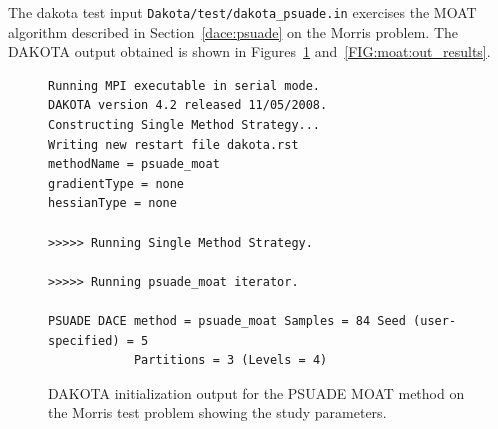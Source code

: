 The dakota test input {\tt Dakota/test/dakota\_psuade.in} exercises
the MOAT algorithm described in Section~\ref{dace:psuade} on the
Morris problem.  The DAKOTA output obtained is shown in
Figures~\ref{FIG:moat:out_preamble} and~\ref{FIG:moat:out_results}.
\begin{figure}[ht!]
\centering
\begin{bigbox}
\begin{small}
\begin{verbatim}
Running MPI executable in serial mode.
DAKOTA version 4.2 released 11/05/2008.
Constructing Single Method Strategy...
Writing new restart file dakota.rst
methodName = psuade_moat
gradientType = none
hessianType = none

>>>>> Running Single Method Strategy.

>>>>> Running psuade_moat iterator.

PSUADE DACE method = psuade_moat Samples = 84 Seed (user-specified) = 5
            Partitions = 3 (Levels = 4)
\end{verbatim}
\end{small}
\end{bigbox}
\caption[DAKOTA initialization output for PSUADE
MOAT.]{\label{FIG:moat:out_preamble} DAKOTA initialization output for
the PSUADE MOAT method on the Morris test problem showing the study
parameters.}
\end{figure}
